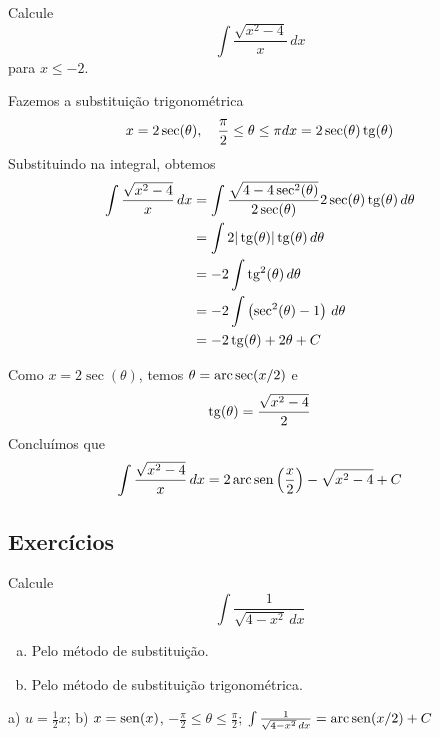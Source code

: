 \begin{exeresol}
  Calcule
  \begin{equation}
    \int\frac{\sqrt{x^2-4}}{x}\,dx
  \end{equation}
  para $x\leq -2$.
\end{exeresol}
\begin{resol}
  Fazemos a substituição trigonométrica
  \begin{equation}
    x = 2\sec(\theta),\quad \frac{\pi}{2}\leq\theta\leq\pi\\
    dx = 2\sec(\theta)\operatorname{tg}(\theta)
  \end{equation}
  Substituindo na integral, obtemos
  \begin{align}
    \int\frac{\sqrt{x^2-4}}{x}\,dx &= \int\frac{\sqrt{4-4\sec^2(\theta)}}{2\sec(\theta)}2\sec(\theta)\operatorname{tg}(\theta)\,d\theta\\
                                   &= \int 2|\operatorname{tg}(\theta)|\operatorname{tg}(\theta)\,d\theta\\
                                   &= -2\int\operatorname{tg}^2(\theta)\,d\theta\\
                                   &= -2\int\left(\sec^2(\theta)-1\right)\,d\theta\\
                                   &= -2\operatorname{tg}(\theta) + 2\theta + C
  \end{align}
  
  Como $x = 2\sec(\theta)$, temos $\theta = \operatorname{arc}\sec(x/2)$ e
  \begin{align}
    \operatorname{tg}(\theta) = \frac{\sqrt{x^2-4}}{2}
  \end{align}
  Concluímos que
  \begin{equation}
    \int\frac{\sqrt{x^2-4}}{x}\,dx = 2\operatorname{arc}\operatorname{sen}\left(\frac{x}{2}\right) - \sqrt{x^2-4} + C
  \end{equation}
\end{resol}

\subsection*{Exercícios}

\begin{exer}
  Calcule
  \begin{equation}
    \int\frac{1}{\sqrt{4-x^2}\,dx}
  \end{equation}
  \begin{enumerate}[a)]
  \item Pelo método de substituição.
  \item Pelo método de substituição trigonométrica.
  \end{enumerate}
\end{exer}
\begin{resp}
  a) $u = \frac{1}{2}x$; b) $x = \operatorname{sen}(x)$, $-\frac{\pi}{2}\leq\theta\leq\frac{\pi}{2}$; $\int\frac{1}{\sqrt{4-x^2}\,dx} = \operatorname{arc}\operatorname{sen}(x/2) + C$
\end{resp}

